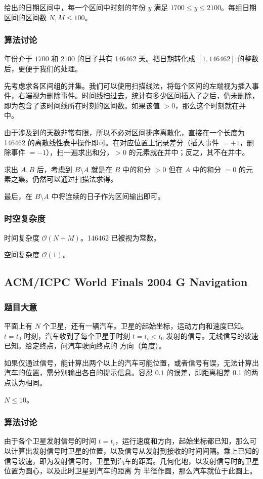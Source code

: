 				给出的日期区间中，每一个区间中时刻的年份 $y$ 满足 $\num{1700} \le y \le \num{2100}$。每组日期区间的区间数 $ N, M\le 100$。
			\subsubsection{算法讨论}
				年份介于 $1700$ 和 $2100$ 的日子共有 \num{146462} 天。把日期转化成 $[1,\num{146462}]$ 的整数后，更便于我们的处理。
				
				先考虑求各区间组的并集。我们可以使用扫描线法，将每个区间的左端视为插入事件，右端视为删除事件。时间线扫过去，统计有多少区间插入了之后，仍未删除，即为包含了该时间线所在时刻的区间数。如果该值 $> 0$，那么这个时刻就在并中。
				
				由于涉及到的天数非常有限，所以不必对区间排序离散化，直接在一个长度为 \num{146462} 的离散线性表中操作即可。在对应位置上记录差分（插入事件 $= +1$，删除事件 $= -1$），扫一遍求出和分，$ > 0$ 的元素就在并中；反之，其不在并中。
				
				求出 $A, B$ 后，考虑到  $B \setminus A$ 就是在 $B$ 中的和分 $> 0 $ 但在 $A$ 中的和分 $ = 0$ 的元素之集。仍然可以通过扫描法求得。
				
				最后，在 $B \setminus A$ 中将连续的日子作为区间输出即可。
			\subsubsection{时空复杂度}
				时间复杂度 $\mathcal{O}\left(N + M\right)$。\num{146462} 已被视为常数。
					
				空间复杂度 $\mathcal{O}\left(1\right)$。
		\newpage
		\subsection{ACM/ICPC World Finals 2004 G Navigation}
			\subsubsection{题目大意}
				平面上有
				$N$ 个卫星，还有一辆汽车。卫星的起始坐标，运动方向和速度已知。$t = t_0$ 时刻，汽车收到了每个卫星于时刻 $t = t_i < t_0$ 发射的信号。无线信号的波速已知。给定终点，问汽车驶向终点的
				 方向（角度）。

				如果仅通过信号，能计算出两个以上的汽车可能位置，或者信号有误，无法计算出汽车的位置，需分别输出各自的提示信息。容忍 $\num{0.1}$ 的误差，即距离相差 0.1 的两点认为相同。
				
				$N \le 10$。
			\subsubsection{算法讨论}
				由于各个卫星发射信号的时间  $t = t_i$，运行速度和方向，起始坐标都已知，那么可以计算出发射信号时卫星的位置，以及信号从发射到接收的时间间隔。乘上已知的信号波速，即为发射信号时，卫星到汽车的距离。几何化地，以发射信号时的卫星位置为圆心，以及此时卫星到汽车的距离
				为
				半径作圆，那么汽车就位于此圆上。
				
